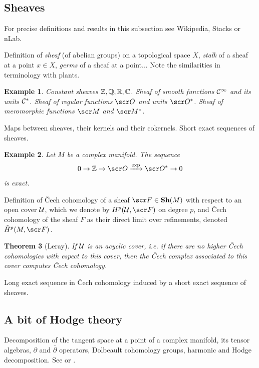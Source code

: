 \documentclass[A4paper, british, reqno]{amsart}
\theoremstyle{darkgreentheorem}
\newtheorem{thm}{Theorem}[section]
\theoremstyle{darkbluedefinition}
\theoremstyle{darkredexample}
\newtheorem{exa}[thm]{Example}
\theoremstyle{remark}
\newcommand{\1}{\mathbbm{1}}
\begin{document}
\subsection{Sheaves}

For precise definitions and results in this subsection see Wikipedia, Stacks or nLab.

Definition of \textit{sheaf} (of abelian groups) on a topological space $X$, \textit{stalk} of a sheaf at a point $x\in X$, \textit{germs} of a sheaf at a point... Note the similarities in terminology with plants.

\begin{exa}
    Constant sheaves $\mathbb{Z},\mathbb{Q},\mathbb{R},\mathbb{C}$.
    Sheaf of smooth functions $\mathcal{C}^{\infty}$ and its units $\mathcal{C}^{*}$.
    Sheaf of regular functions $\O$ and units $\O^{*}$.
    Sheaf of meromorphic functions $\M$ and $\M^{*}$.
\end{exa}

Maps between sheaves, their kernels and their cokernels.
Short exact sequences of sheaves.

\begin{exa}
    Let $M$ be a complex manifold.
    The sequence
    \[ 0\to \Z\to \O\xrightarrow{\exp} \O^{*}\to 0 \]
    is exact.
\end{exa}

Definition of \v{C}ech cohomology of a sheaf $\F\in \Sh(M)$ with respect to an open cover $\mathcal{U}$, which we denote by $H^{p}(\U,\F)$ on degree $p$, and \v{C}ech cohomology of the sheaf $F$ as their direct limit over refinements, denoted $\check{H}^{p}(M,\F)$.

\begin{thm}[Leray]
    If $\mathcal{U}$ is an acyclic cover, i.e. if there are no higher \v{C}ech cohomologies with espect to this cover, then the \v{C}ech complex associated to this cover computes \v{C}ech cohomology.
\end{thm}

Long exact sequence in \v{C}ech cohomology induced by a short exact sequence of sheaves.

\subsection{A bit of Hodge theory}

Decomposition of the tangent space at a point of a complex manifold, its tensor algebras, $\partial $ and $\bar{\partial }$ operators, Dolbeault cohomology groups, harmonic and Hodge decomposition.
See \cite{gh78} or \cite{voi07a}.
\end{document}
